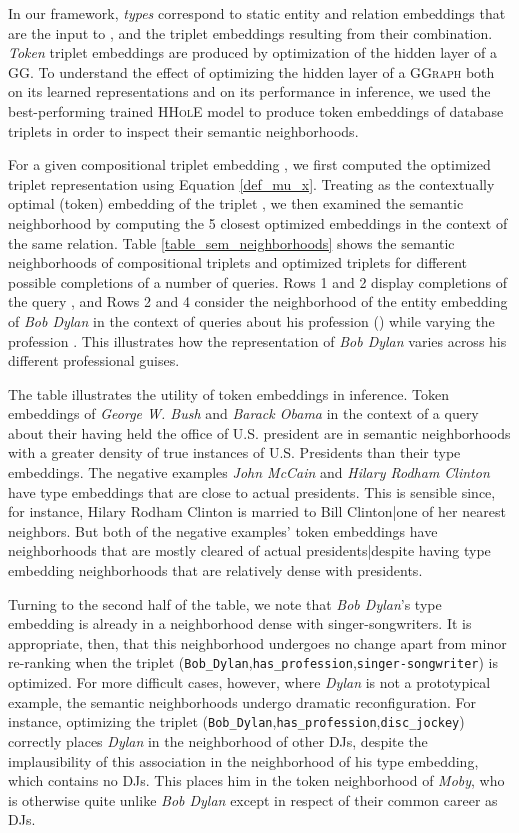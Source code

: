 \documentclass[a4paper,10pt]{article}
\begin{document}
In our framework, \emph{types} correspond to static entity and relation embeddings that are the input to , and the triplet embeddings resulting from their combination. \emph{Token} triplet embeddings are produced by optimization of the hidden layer of a \textsc{GG}. 
To understand the effect of optimizing the hidden layer of a \textsc{GGraph} both on its learned representations and on its performance in inference, we used the best-performing trained \textsc{HHolE} model to produce token embeddings of database triplets in order to inspect their semantic neighborhoods. 

For a given compositional triplet embedding , we first computed the optimized triplet representation  using Equation \ref{def_mu_x}. Treating  as the contextually optimal (token) embedding of the triplet , we then examined the semantic neighborhood by computing the 5 closest optimized embeddings in the context of the same relation. Table \ref{table_sem_neighborhoods} shows the semantic neighborhoods of compositional triplets  and optimized triplets  for different possible completions of a number of queries. Rows 1 and 2 display completions of the query , and Rows 2 and 4 consider the neighborhood of the entity embedding of \emph{Bob Dylan} in the context of queries about his profession () while varying the profession . This illustrates how the representation of \emph{Bob Dylan} varies across his different professional guises. 

The table illustrates the utility of token embeddings in inference. Token embeddings of \emph{George W. Bush} and \emph{Barack Obama} in the context of a query about their having held the office of U.S. president are in semantic neighborhoods with a greater density of true instances of U.S. Presidents than their type embeddings. The negative examples \emph{John McCain} and \emph{Hilary Rodham Clinton} have type embeddings that are close to actual presidents. This is sensible since, for instance, Hilary Rodham Clinton is married to Bill Clinton|one of her nearest neighbors. But both of the negative examples' token embeddings have neighborhoods that are mostly cleared of actual presidents|despite having type embedding neighborhoods that are relatively dense with presidents. 

Turning to the second half of the table, we note that \emph{Bob Dylan}'s type embedding is already in a neighborhood dense with singer-songwriters. It is appropriate, then, that this neighborhood undergoes no change apart from minor re-ranking when the triplet (\texttt{Bob\_{}Dylan},\texttt{has\_{}profession},\texttt{singer-songwriter}) is optimized. For more difficult cases, however, where \emph{Dylan} is not a prototypical example, the semantic neighborhoods undergo dramatic reconfiguration. For instance, optimizing the triplet (\texttt{Bob\_{}Dylan},\texttt{has\_{}profession},\texttt{disc\_{}jockey}) correctly places \emph{Dylan} in the neighborhood of other DJs, despite the implausibility of this association in the neighborhood of his type embedding, which contains no DJs. This places him in the token neighborhood of \emph{Moby}, who is otherwise quite unlike \emph{Bob Dylan} except in respect of their common career as DJs. 
\end{document}

